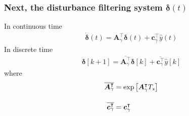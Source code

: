 \subsubsection{Next, the disturbance filtering system $\boldsymbol{\delta}(t)$}
In continuous time
\begin{align*}
\boldsymbol{\dot{\delta}}(t) = \boldsymbol{A}_\gamma^\intercal \boldsymbol{\delta}(t) + \boldsymbol{c}_\gamma^\intercal \hat{y}(t)
\end{align*}
In discrete time
\begin{align*}
\boldsymbol{\delta}[k + 1] = \overline{\boldsymbol{A}_\gamma^\intercal}\boldsymbol{\delta}[k] + \overline{\boldsymbol{c}_\gamma^\intercal} \hat{y}[k]
\end{align*}
where
\begin{align*}
\overline{\boldsymbol{A}_\gamma^\intercal} &= \exp{\left[\boldsymbol{A}_\gamma^\intercal T_s\right]}
\\[11pt]
\overline{\boldsymbol{c}_\gamma^\intercal} &= \boldsymbol{c}_\gamma^\intercal
\end{align*}
\fi
